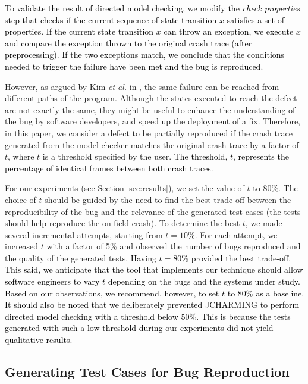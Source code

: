 \documentclass[times, doublespace]{smrauth}
\newcommand{\red}[1]{\textcolor{black}{#1}}
\begin{document}
{\red{To validate the result of directed model checking, we modify
the {\it check properties} step that checks if the current sequence
of state transition $x$ satisfies a set of properties. If the current
state transition $x$ can throw an exception, we execute $x$ and
compare the exception thrown to the original crash trace (after
preprocessing). If the two exceptions match, we conclude that
the conditions needed to trigger the failure have been met and
the bug is reproduced.}

However, as argued by Kim {\it et al.} in \cite{Kim2013b}, the same failure can
be reached from different paths of the program. Although the
states executed to reach the defect are not exactly the same,
they might be useful to enhance the understanding of the bug
by software developers, and speed up the deployment of a fix.
Therefore, in this paper, we consider a defect to be partially
reproduced if the crash trace generated from the model
checker matches the original crash trace by a factor of $t$, where
$t$ is a threshold specified by the user. \red{The threshold, $t$, represents the percentage of
identical frames between both crash traces.}

For our experiments (see Section \ref{sec:results}), we set the value of $t$ to 80\%.
The choice of $t$ should be guided by the need to find the best trade-off
between the reproducibility of the bug and
the relevance  of the generated test cases (the tests should help
 reproduce the on-field crash). To determine the best $t$, we made several incremental attempts, starting  from $t = 10\%$.  For each attempt, we increased $t$ with a factor of 5\% and
observed the number of bugs reproduced and the quality of the generated tests.
\red{Having $t = 80\%$ provided the best trade-off. This said, we anticipate that the tool that implements
our technique should allow software engineers to vary $t$ depending on the bugs and the systems under study. Based on our observations, we recommend, however,
to set $t$ to 80\% as a baseline. It should also be noted that we deliberately prevented JCHARMING to perform directed model checking with a threshold below 50\%. This is because the tests generated with such a low threshold during our experiments did not yield qualitative results.}


\subsection{Generating Test Cases for Bug Reproduction\label{sec:unit-tests}}

}
\end{document}
